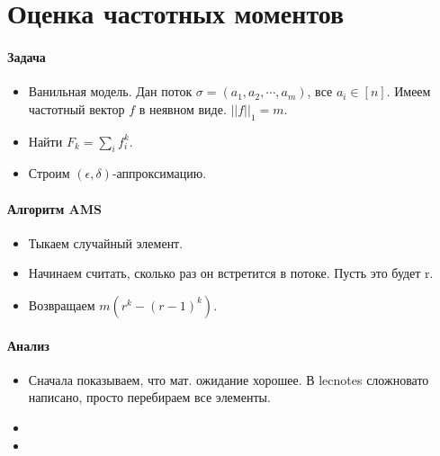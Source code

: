 \section{Оценка частотных моментов} %
\label{sec:frequent_moment}

\paragraph{Задача} %
\label{par:problem}

\begin{itemize}
	\item Ванильная модель. Дан поток $\sigma = (a_1, a_2, \cdots, a_m)$, все $a_i \in [n]$. Имеем частотный вектор $f$ в неявном виде. $||f||_1 = m$. 
	\item Найти $F_k = \sum_i f_i^k$.
	\item Строим $(\epsilon, \delta)$-аппроксимацию.
\end{itemize}

\paragraph{Алгоритм AMS} %
\label{par:ams_algo}

\begin{itemize}
	\item Тыкаем случайный элемент. 
	\item Начинаем считать, сколько раз он встретится в потоке. Пусть это будет r.
	\item Возвращаем $m (r^k - (r - 1)^k)$.
\end{itemize}


\paragraph{Анализ} %
\label{par:analysis}

\begin{itemize}
	\item Сначала показываем, что мат. ожидание хорошее. В lecnotes сложновато написано, просто перебираем все элементы.
	\item 
	\item 
\end{itemize}


